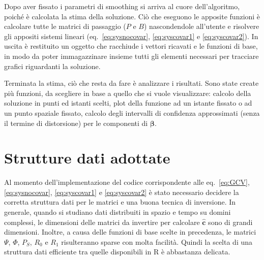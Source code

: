\documentclass[a4paper,11pt,twoside,openright]{book}							%
\begin{document}
Dopo aver fissato i parametri di smoothing si arriva al cuore dell'algoritmo, poiché è calcolata la stima della soluzione. Ciò che eseguono le apposite funzioni è calcolare tutte le matrici di passaggio ($P$ e $B$) nascondendole all'utente e risolvere gli appositi sistemi lineari (eq.~\ref{eq:sysnocovar}, \ref{eq:syscovar1} e \ref{eq:syscovar2}). In uscita è restituito un oggetto che racchiude i vettori ricavati e le funzioni di base, in modo da poter immagazzinare insieme tutti gli elementi necessari per tracciare grafici riguardanti la soluzione.

Terminata la stima, ciò che resta da fare è analizzare i risultati. Sono state create più funzioni, da scegliere in base a quello che si vuole visualizzare: calcolo della soluzione in punti ed istanti scelti, plot della funzione ad un istante fissato o ad un punto spaziale fissato, calcolo degli intervalli di confidenza approssimati (senza il termine di distorsione) per le componenti di $\bm{\beta}$.

\section{Strutture dati adottate}
Al momento dell'implementazione del codice corrispondente alle eq.~\ref{eq:GCV}, \ref{eq:sysnocovar}, \ref{eq:syscovar1} e \ref{eq:syscovar2} è stato necessario decidere la corretta struttura dati per le matrici e una buona tecnica di inversione. In generale, quando si studiano dati distribuiti in spazio e tempo su domini complessi, le dimensioni delle matrici da invertire per calcolare $\hat{\bm{c}}$ sono di grandi dimensioni. Inoltre, a causa delle funzioni di base scelte in precedenza, le matrici $\Psi$, $\Phi$, $P_S$, $R_0$ e $R_1$ risulteranno sparse con molta facilità. Quindi la scelta di una struttura dati efficiente tra quelle disponibili in R è abbastanza delicata.
\end{document}
